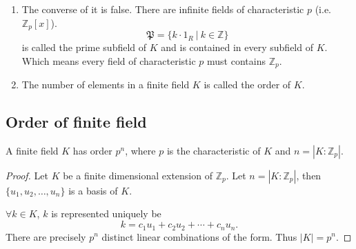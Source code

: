 \begin{remark}
    \begin{enumerate}
        \item The converse of it is false. There are infinite fields of characteristic $p$ (i.e. $\mathbb{Z}_p[x]$). 
        \[
            \mathfrak{P} = \{ k \cdot 1_R \> | \> k \in \mathbb{Z} \}
        \]
        is called the prime subfield of $K$ and is contained in every subfield of $K$. Which means 
        every field of characteristic $p$ must contains $\mathbb{Z}_p$.

        \item The number of elements in a finite field $K$ is called the order of $K$.
    \end{enumerate}
\end{remark}

\subsection{Order of finite field}

\begin{theorem}
    A finite field $K$ has order $p^n$, where $p$ is the characteristic of $K$ 
    and $n = |K:\mathbb{Z}_p|$.
\end{theorem}
\begin{proof}
    Let $K$ be a finite dimensional extension of $\mathbb{Z}_p$. Let $n = |K:\mathbb{Z}_p|$, then 
    $\{ u_1, u_2, \ldots, u_n \}$ is a basis of $K$.

    $\forall k \in K$, $k$ is represented uniquely be 
    \[
        k = c_1 u_1 + c_2 u_2 + \cdots + c_nu_n.
    \]
    There are precisely $p^n$ distinct linear combinations of the form. Thus 
    $|K| = p^n$.
\end{proof}

